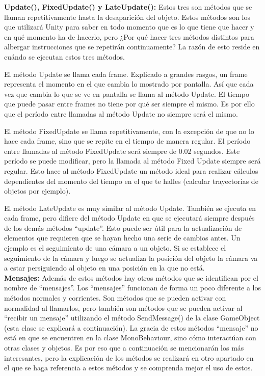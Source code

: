 \textbf{Update(), FixedUpdate() y LateUpdate():} Estos tres son métodos que se llaman repetitivamente hasta la desaparición del objeto. Estos métodos son los que utilizará Unity para saber en todo momento que es lo que tiene que hacer y en qué momento ha de hacerlo, pero ¿Por qué hacer tres métodos distintos para albergar instrucciones que se repetirán continuamente? La razón de esto reside en cuándo se ejecutan estos tres métodos.

El método Update se llama cada frame. Explicado a grandes rasgos, un frame representa el momento en el que cambia lo mostrado por pantalla. Así que cada vez que cambia lo que se ve en pantalla se llama al método Update. El tiempo que puede pasar entre frames no tiene por qué ser siempre el mismo. Es por ello que el período entre llamadas al método Update no siempre será el mismo.

El método FixedUpdate se llama repetitivamente, con la excepción de que no lo hace cada frame, sino que se repite en el tiempo de manera regular. El período entre llamadas al método FixedUpdate será siempre de 0.02 segundos. Este período se puede modificar, pero la llamada al método Fixed Update siempre será regular. Esto hace al método FixedUpdate un método ideal para realizar cálculos dependientes del momento del tiempo en el que te halles (calcular trayectorias de objetos por ejemplo).

El método LateUpdate es muy similar al método Update. También se ejecuta en cada frame, pero difiere del método Update en que se ejecutará siempre después de los demás métodos “update”. Esto puede ser útil para la actualización de elementos que requieren que se hayan hecho una serie de cambios antes. Un ejemplo es el seguimiento de una cámara a un objeto. Si se establece el seguimiento de la cámara y luego se actualiza la posición del objeto la cámara va a estar persiguiendo al objeto en una posición en la que no está.\\


\textbf{Mensajes:} Además de estos métodos hay otros métodos que se identifican por el nombre de “mensajes”. Los “mensajes” funcionan de forma un poco diferente a los métodos normales y corrientes. Son métodos que se pueden activar con normalidad al llamarlos, pero también son métodos que se pueden activar al “recibir un mensaje” utilizando el método SendMessage() de la clase GameObject (esta clase se explicará a continuación). La gracia de estos métodos “mensaje” no está en que se encuentren en la clase MonoBehaviour, sino cómo interactúan con otras clases y objetos. Es por eso que a continuación se mencionarán los más interesantes, pero la explicación de los métodos se realizará en otro apartado en el que se haga referencia a estos métodos y se comprenda mejor el uso de estos.

